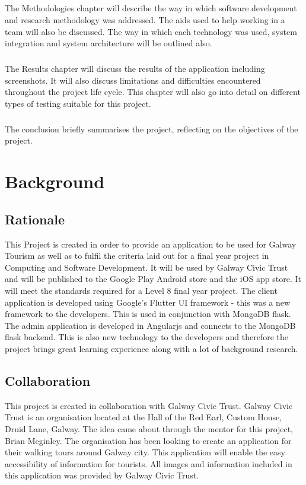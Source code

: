 \paragraph{}The Methodologies chapter will describe the way in which software development and research methodology was addressed. The aids used to help working in a team will also be discussed. The way in which each technology was used, system integration and system architecture will be outlined also.
\paragraph{}The Results chapter will discuss the results of the application including screenshots. It will also discuss limitations and difficulties encountered throughout the project life cycle. This chapter will also go into detail on different types of testing suitable for this project.
\paragraph{}The conclusion briefly summarises the project, reflecting on the objectives of the project.

\chapter{Background}
\section{Rationale}
This Project is created in order to provide an application to be used for Galway Tourism as well as to fulfil the criteria laid out for a final year project in Computing and Software Development. It will be used by Galway Civic Trust and will be published to the Google Play Android store and the iOS app store. It will meet the standards required for a Level 8 final year project. The client application is developed using Google’s Flutter UI framework - this was a new framework to the developers. This is used in conjunction with MongoDB flask. The admin application is developed in Angularjs and connects to the MongoDB flask backend. This is also new technology to the developers and therefore the project brings great learning experience along with a lot of background research.

\section{Collaboration}
This project is created in collaboration with Galway Civic Trust. Galway Civic Trust is an organisation located at the Hall of the Red Earl, Custom House, Druid Lane, Galway. The idea came about through the mentor for this project, Brian Mcginley. The organisation has been looking to create an application for their walking tours around Galway city. This application will enable the easy accessibility of information for tourists. All images and information included in this application was provided by Galway Civic Trust.

